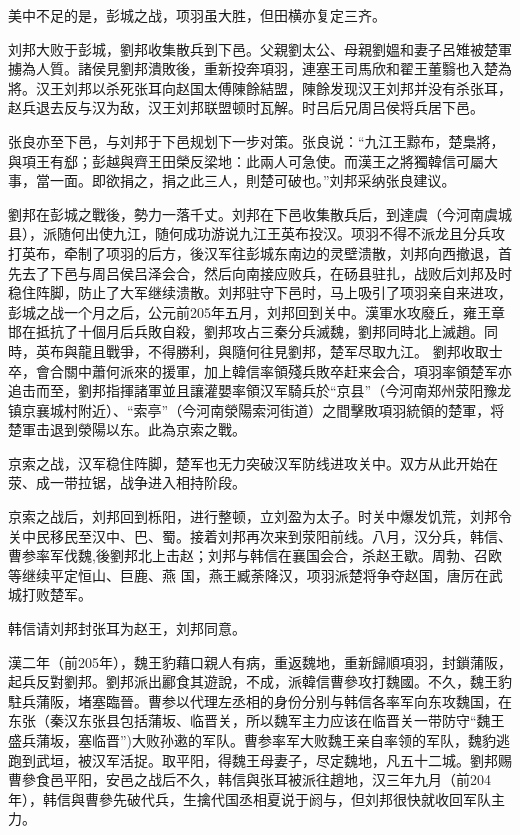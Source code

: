 美中不足的是，彭城之战，项羽虽大胜，但田横亦复定三齐。

刘邦大败于彭城，劉邦收集散兵到下邑。父親劉太公、母親劉媼和妻子呂雉被楚軍擄為人質。諸侯見劉邦潰敗後，重新投奔項羽，連塞王司馬欣和翟王董翳也入楚為將。汉王刘邦以杀死张耳向赵国太傅陳餘結盟，陳餘发现汉王刘邦并没有杀张耳，赵兵退去反与汉为敌，汉王刘邦联盟顿时瓦解。时吕后兄周吕侯将兵居下邑。

张良亦至下邑，与刘邦于下邑规划下一步对策。张良说：“九江王黥布，楚梟將，與項王有郄；彭越與齊王田榮反梁地：此兩人可急使。而漢王之將獨韓信可屬大事，當一面。即欲捐之，捐之此三人，則楚可破也。”刘邦采纳张良建议。

劉邦在彭城之戰後，勢力一落千丈。刘邦在下邑收集散兵后，到達虞（今河南虞城县），派随何出使九江，随何成功游说九江王英布投汉。项羽不得不派龙且分兵攻打英布，牵制了项羽的后方，後汉军往彭城东南边的灵壁溃散，刘邦向西撤退，首先去了下邑与周吕侯吕泽会合，然后向南接应败兵，在砀县驻扎，战败后刘邦及时稳住阵脚，防止了大军继续溃散。刘邦驻守下邑时，马上吸引了项羽亲自来进攻，彭城之战一个月之后，公元前205年五月，刘邦回到关中。漢軍水攻廢丘，雍王章邯在抵抗了十個月后兵敗自殺，劉邦攻占三秦分兵滅魏，劉邦同時北上滅趙。同時，英布與龍且戰爭，不得勝利，與隨何往見劉邦，楚军尽取九江。 劉邦收取士卒，會合關中蕭何派來的援軍，加上韓信率領殘兵敗卒赶来会合，項羽率領楚军亦追击而至，劉邦指揮諸軍並且讓灌嬰率領汉军騎兵於“京县”（今河南郑州荥阳豫龙镇京襄城村附近）、“索亭”（今河南滎陽索河街道）之間擊敗項羽統領的楚軍，将楚軍击退到滎陽以东。此為京索之戰。

京索之战，汉军稳住阵脚，楚军也无力突破汉军防线进攻关中。双方从此开始在荥、成一带拉锯，战争进入相持阶段。

京索之战后，刘邦回到栎阳，进行整顿，立刘盈为太子。时关中爆发饥荒，刘邦令关中民移民至汉中、巴、蜀。接着刘邦再次来到荥阳前线。八月，汉分兵，韩信、曹参率军伐魏,後劉邦北上击赵；刘邦与韩信在襄国会合，杀赵王歇。周勃、召欧等继续平定恒山、巨鹿、燕 国，燕王臧荼降汉，项羽派楚将争夺赵国，唐厉在武城打败楚军。

韩信请刘邦封张耳为赵王，刘邦同意。

漢二年（前205年），魏王豹藉口親人有病，重返魏地，重新歸順項羽，封鎖蒲阪，起兵反對劉邦。劉邦派出酈食其遊說，不成，派韓信曹參攻打魏國。不久，魏王豹駐兵蒲阪，堵塞臨晉。曹参以代理左丞相的身份分别与韩信各率军向东攻魏国，在东张（秦汉东张县包括蒲坂、临晋关，所以魏军主力应该在临晋关一带防守“魏王盛兵蒲坂，塞临晋”)大败孙遫的军队。曹参率军大败魏王亲自率领的军队，魏豹逃跑到武垣，被汉军活捉。取平阳，得魏王母妻子，尽定魏地，凡五十二城。劉邦赐曹參食邑平阳，安邑之战后不久，韩信與张耳被派往趙地，汉三年九月（前204年），韩信與曹參先破代兵，生擒代国丞相夏说于阏与，但刘邦很快就收回军队主力。

